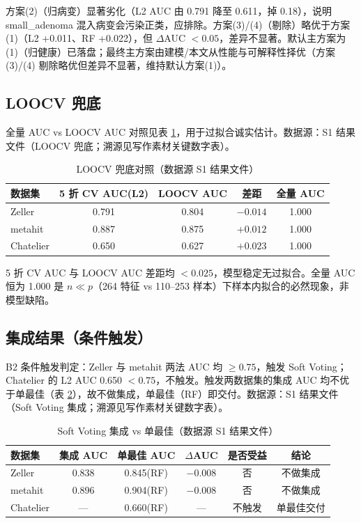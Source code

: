 \documentclass{internal-report}
\begin{document}
方案(2)（归病变）显著劣化（L2 AUC 由 0.791 降至 0.611，掉 0.18），说明 small\_adenoma 混入病变会污染正类，应排除。方案(3)/(4)（剔除）略优于方案(1)（L2 +0.011、RF +0.022），但 $\Delta$AUC $<0.05$，差异不显著。默认主方案为(1)（归健康）已落盘；最终主方案由建模/本文从性能与可解释性择优（方案(3)/(4) 剔除略优但差异不显著，维持默认方案(1)）。

\subsection{LOOCV 兜底}
全量 AUC vs LOOCV AUC 对照见表 \ref{tab:loocv}，用于过拟合诚实估计。数据源：S1 结果文件（LOOCV 兜底；溯源见写作素材关键数字表）。

\begin{table}[ht]
\centering
\caption{LOOCV 兜底对照（数据源 S1 结果文件）}
\label{tab:loocv}
\begin{tabular}{l c c c c}
\toprule
数据集 & 5 折 CV AUC(L2) & LOOCV AUC & 差距 & 全量 AUC \\
\midrule
Zeller & 0.791 & 0.804 & $-0.014$ & 1.000 \\
metahit & 0.887 & 0.875 & $+0.012$ & 1.000 \\
Chatelier & 0.650 & 0.627 & $+0.023$ & 1.000 \\
\bottomrule
\end{tabular}
\end{table}

5 折 CV AUC 与 LOOCV AUC 差距均 $<0.025$，模型稳定无过拟合。全量 AUC 恒为 1.000 是 $n\ll p$（264 特征 vs 110--253 样本）下样本内拟合的必然现象，非模型缺陷。

\subsection{集成结果（条件触发）}
B2 条件触发判定：Zeller 与 metahit 两法 AUC 均 $\geq 0.75$，触发 Soft Voting；Chatelier 的 L2 AUC 0.650 $<0.75$，不触发。触发两数据集的集成 AUC 均不优于单最佳（表 \ref{tab:ensemble}），故不做集成，单最佳（RF）即交付。数据源：S1 结果文件（Soft Voting 集成；溯源见写作素材关键数字表）。

\begin{table}[ht]
\centering
\caption{Soft Voting 集成 vs 单最佳（数据源 S1 结果文件）}
\label{tab:ensemble}
\begin{tabular}{l c c c c c}
\toprule
数据集 & 集成 AUC & 单最佳 AUC & $\Delta$AUC & 是否受益 & 结论 \\
\midrule
Zeller & 0.838 & 0.845(RF) & $-0.008$ & 否 & 不做集成 \\
metahit & 0.896 & 0.904(RF) & $-0.008$ & 否 & 不做集成 \\
Chatelier & — & 0.660(RF) & — & 不触发 & 单最佳交付 \\
\bottomrule
\end{tabular}
\end{table}
\end{document}
